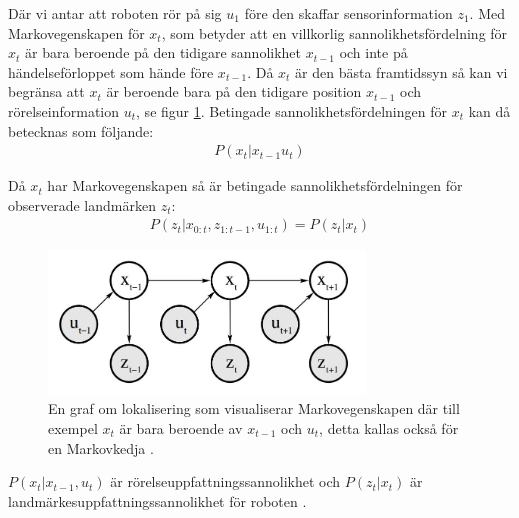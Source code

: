 Där vi antar att roboten rör på sig $u_1$ före den skaffar sensorinformation $z_1$. Med Markovegenskapen för $x_t$, som betyder att en villkorlig sannolikhetsfördelning för $x_t$ är bara beroende på den tidigare sannolikhet $x_{t-1}$ och inte på händelseförloppet som hände före $x_{t-1}$. Då $x_t$ är den bästa framtidssyn så kan vi begränsa att $x_t$ är beroende bara på den tidigare position $x_{t-1}$ och rörelseinformation $u_t$, se figur \ref{markov}. Betingade sannolikhetsfördelningen för $x_t$ kan då betecknas som följande:
\begin{align}
    P(x_t | x_{t-1} u_{t})
\end{align}

Då $x_t$ har Markovegenskapen så är betingade sannolikhetsfördelningen för observerade landmärken $z_t$:
\begin{align}
    P(z_t | x_{0:t}, z_{1:t-1}, u_{1:t}) = P(z_t|x_t)
\end{align}

\begin{figure}[ht]
    \begin{center}
    \includegraphics[width=0.75\textwidth]{markov.JPG}
    \caption{En graf om lokalisering som visualiserar Markovegenskapen där till exempel $x_t$ är bara beroende av $x_{t-1}$ och $u_t$, detta kallas också för en Markovkedja \citep{ProbabilisticRobotics}.}
    \label{markov}
    \end{center}
\end{figure}

$P(x_t|x_{t-1}, u_{t})$ är rörelseuppfattningssannolikhet och $P(z_t|x_t)$ är landmärkesuppfattningssannolikhet för roboten \citep{ProbabilisticRobotics}. 

